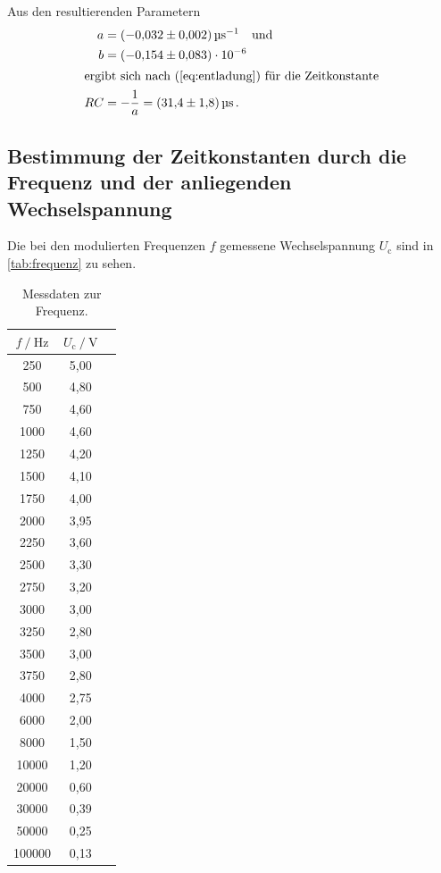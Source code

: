 Aus den resultierenden Parametern
\begin{align*}
  a &= \qty[per-mode=reciprocal]{-0.032(002)}{\per\micro\second} \quad \text{und} \\
  b &= (\num{-0.154(083)}) \cdot 10^{-6} \\
  \intertext{ergibt sich nach (\ref{eq:entladung}) für die Zeitkonstante}
  RC &= - \frac{1}{a} = \qty{31.4(1.8)}{\micro\second} \, .
\end{align*}


\subsection{Bestimmung der Zeitkonstanten durch die Frequenz und der anliegenden Wechselspannung}

Die bei den modulierten Frequenzen $f$ gemessene Wechselspannung $U_\text{c}$  sind in \autoref{tab:frequenz} zu sehen. 
\begin{table} [h]
  \centering
  \caption{Messdaten zur Frequenz.}
  \label{tab:frequenz}
  \begin{tabular}{c c c}
    \toprule
    $f \mathbin{/} \unit{\hertz}$ & $U_\text{c} \mathbin{/} \unit{\volt}$ \\
    \midrule
       250 & 5,00 \\
       500 & 4,80 \\
       750 & 4,60 \\
      1000 & 4,60 \\
      1250 & 4,20 \\
      1500 & 4,10 \\
      1750 & 4,00 \\
      2000 & 3,95 \\
      2250 & 3,60 \\
      2500 & 3,30 \\
      2750 & 3,20 \\
      3000 & 3,00 \\
      3250 & 2,80 \\
      3500 & 3,00 \\
      3750 & 2,80 \\
      4000 & 2,75 \\
      6000 & 2,00 \\
      8000 & 1,50 \\
     10000 & 1,20 \\
     20000 & 0,60 \\
     30000 & 0,39 \\
     50000 & 0,25 \\
    100000 & 0,13 \\
    \bottomrule
  \end{tabular}
\end{table}


